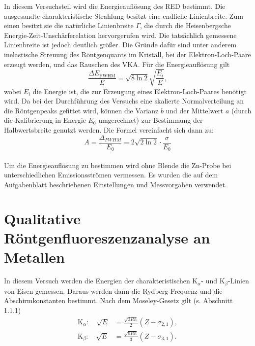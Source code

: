 In diesem Versuchsteil wird die Energieauflösung des RED bestimmt. Die ausgesandte charakteristische Strahlung besitzt eine endliche Linienbreite. Zum einen besitzt sie die natürliche Linienbreite $\Gamma$, die durch die Heisenbergsche Energie-Zeit-Unschärferelation hervorgerufen wird.
Die tatsächlich gemessene Linienbreite ist jedoch deutlich größer. Die Gründe dafür sind unter anderem inelastische Streuung des Röntgenquants im Kristall, bei der Elektron-Loch-Paare erzeugt werden, und das Rauschen des VKA.
Für die Energieauflösung gilt \cite{litmap} %
\begin{equation}
 \frac{\Delta E_{\textrm{FWHM}}}{E} = \sqrt{8\ln2}\sqrt{\frac{E_{i}}{E}},
\end{equation}
wobei $E_{i}$ die Energie ist, die zur Erzeugung eines Elektron-Loch-Paares benötigt wird. Da bei der Durchführung des Versuchs eine skalierte Normalverteilung an die Röntgenpeaks gefittet wird, können die Varianz $b$ und der Mittelwert $a$ (durch die Kalibrierung in Energie $E_0$ umgerechnet) zur Bestimmung der Halbwertsbreite genutzt werden. Die Formel vereinfacht sich dann zu:
\begin{equation}
	A = \frac{\Delta_{FWHM}}{E_0} = 2\sqrt{2\ln 2}\cdot\frac{\sigma}{E_0}
	\label{eq:aufloesung}
\end{equation}\\
Um die Energieauflösung zu bestimmen wird ohne Blende die Zn-Probe bei unterschiedlichen Emissionsströmen vermessen. Es wurden die auf dem Aufgabenblatt beschriebenen Einstellungen und Messvorgaben verwendet.\\

\section{Qualitative Röntgenfluoreszenzanalyse an Metallen}

In diesem Versuch werden die Energien der charakteristischen K$_{\alpha}$- und K$_{\beta}$-Linien von Eisen gemessen. Daraus werden dann die Rydberg-Frequenz und die Abschirmkonstanten bestimmt.
Nach dem Moseley-Gesetz gilt (s. Abschnitt 1.1.1)
\begin{align}
 \textrm{K}_{\alpha}: \quad \sqrt{E} &= \frac{\sqrt{3Rh}}{2}\left(Z-\sigma_{2,1}\right), \\ 
 \textrm{K}_{\beta}: \quad \sqrt{E} &= \frac{\sqrt{8Rh}}{3}\left(Z-\sigma_{3,1}\right).
\end{align}

